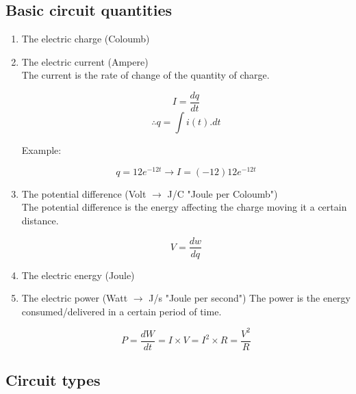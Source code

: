 \documentclass[a4paper]{book}
\begin{document}
\subsection{Basic circuit quantities}

\begin{enumerate}

  \item The electric charge (Coloumb)

  \item The electric current (Ampere)\\
    The current is the rate of change of the quantity of charge.

    \[I = \frac{dq}{dt}\]
    \[\therefore q = \int i(t).dt\]

    Example:

    \[q = 12e^{-12t} \to I = (-12)12e^{-12t}\]

  \item The potential difference (Volt $\to$ J/C "Joule per Coloumb")\\
    The potential difference is the energy affecting the charge moving it a certain distance.

    \[V = \frac{dw}{dq}\]

  \item The electric energy (Joule)

  \item The electric power (Watt $\to$ J/s "Joule per second")
    The power is the energy consumed/delivered in a certain period of time.

    \[P = \frac{dW}{dt} = I \times V = I^{2} \times R = \frac{V^2}{R}\]

\end{enumerate}

\subsection{Circuit types}
\end{document}
